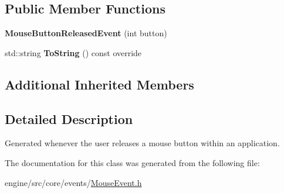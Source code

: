 \subsection*{Public Member Functions}
\begin{DoxyCompactItemize}
\item 
\mbox{\label{classengine_1_1events_1_1MouseButtonReleasedEvent_a11f83d0912db1dc81c4bd8b69a5e33c3}} 
{\bfseries Mouse\+Button\+Released\+Event} (int button)
\item 
\mbox{\label{classengine_1_1events_1_1MouseButtonReleasedEvent_ae1cd60e0cad5a31fc6baaa15944fd212}} 
std\+::string {\bfseries To\+String} () const override
\end{DoxyCompactItemize}
\subsection*{Additional Inherited Members}


\subsection{Detailed Description}
Generated whenever the user releases a mouse button within an application. 

The documentation for this class was generated from the following file\+:\begin{DoxyCompactItemize}
\item 
engine/src/core/events/\hyperlink{MouseEvent_8h}{Mouse\+Event.\+h}\end{DoxyCompactItemize}
